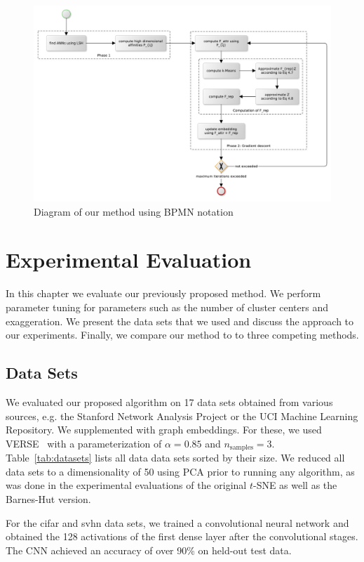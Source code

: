 \begin{figure}[tbp]
  \centering
  \includegraphics[width=\textwidth]{img/pseudo}
  \caption{Diagram of our method using BPMN notation}
  \label{fig:flow}
\end{figure}

\chapter{Experimental Evaluation}\label{ch:eval}

In this chapter we evaluate our previously proposed method. We perform parameter tuning
for parameters such as the number of cluster centers and exaggeration. We present the
data sets that we used and discuss the approach to our experiments. Finally, we compare
our method to to three competing methods.

\section{Data Sets}

We evaluated our proposed algorithm on 17 data sets obtained from various
sources, e.g.  the Stanford Network Analysis Project or the UCI Machine
Learning Repository. We supplemented with graph embeddings. For these, we used
VERSE~\cite{verse} with a parameterization of $\alpha = 0.85$ and
$n_\text{samples} = 3$.  Table~\ref{tab:datasets} lists all data data sets
sorted by their size. We reduced all data sets to a dimensionality of 50 using
PCA prior to running any algorithm, as was done in the experimental evaluations
of the original $t$-SNE as well as the Barnes-Hut version. %

For the cifar and svhn data sets, we trained a convolutional neural network and obtained the 128
activations of the first dense layer after the convolutional stages. The CNN achieved
an accuracy of over 90\% on held-out test data.

